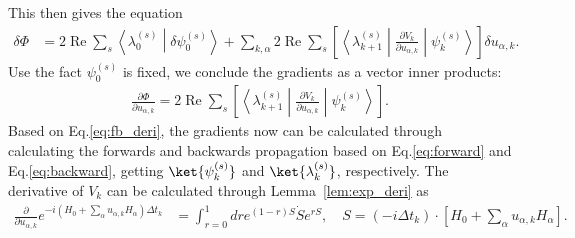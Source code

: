 This then gives the equation
\begin{align}
\delta\Phi&=
    2\operatorname{Re}\sum_s\left\langle\lambda_0^{(s)}\middle|\delta\psi_0^{(s)}\right\rangle+\sum_{k,\alpha}2\operatorname{Re}\sum_s\left[\left\langle\lambda_{k+1}^{(s)}\middle|\frac{\partial V_k}{\partial u_{\alpha, k}}\middle|\psi_k^{(s)}\right\rangle\right]\delta u_{\alpha,k}.
\end{align}
Use the fact $\psi_0^{(s)}$ is fixed, we conclude the gradients as a vector inner products:
\begin{align}\label{eq:fb_deri}
    \frac{\partial \Phi}{\partial u_{\alpha,k}} = 2\operatorname{Re}\sum_s\left[\left\langle\lambda_{k+1}^{(s)}\middle|\frac{\partial V_k}{\partial u_{\alpha, k}}\middle|\psi_k^{(s)}\right\rangle\right].
\end{align}
Based on Eq.\eqref{eq:fb_deri}, the gradients now can be calculated through calculating the forwards and backwards propagation based on Eq.\eqref{eq:forward} and Eq.\eqref{eq:backward}, getting $\ket{\psi_k^{(s)}}$ and $\ket{\lambda_k^{(s)}}$, respectively. 
The derivative of $V_k$ can be calculated through Lemma~\ref{lem:exp_deri} as
\begin{align}
\frac{\partial}{\partial u_{\alpha, k}}  e^{-i(H_0+\sum_\alpha u_{\alpha,k}H_\alpha) \Delta t_k}&= \int_{r = 0}^1 dr e^{(1-r)S} \dot{S} e^{rS},\quad S = (-i\Delta t_k) \cdot \left[H_0 + \sum_{\alpha} u_{\alpha,k} H_{\alpha}\right].
\end{align}
